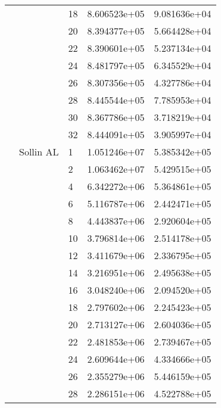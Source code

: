 \begin{tabular}{lllrr}
                      &            & 18 &  8.606523e+05 &  9.081636e+04 \\
                      &            & 20 &  8.394377e+05 &  5.664428e+04 \\
                      &            & 22 &  8.390601e+05 &  5.237134e+04 \\
                      &            & 24 &  8.481797e+05 &  6.345529e+04 \\
                      &            & 26 &  8.307356e+05 &  4.327786e+04 \\
                      &            & 28 &  8.445544e+05 &  7.785953e+04 \\
                      &            & 30 &  8.367786e+05 &  3.718219e+04 \\
                      &            & 32 &  8.444091e+05 &  3.905997e+04 \\
                      & Sollin AL & 1  &  1.051246e+07 &  5.385342e+05 \\
                      &            & 2  &  1.063462e+07 &  5.429515e+05 \\
                      &            & 4  &  6.342272e+06 &  5.364861e+05 \\
                      &            & 6  &  5.116787e+06 &  2.442471e+05 \\
                      &            & 8  &  4.443837e+06 &  2.920604e+05 \\
                      &            & 10 &  3.796814e+06 &  2.514178e+05 \\
                      &            & 12 &  3.411679e+06 &  2.336795e+05 \\
                      &            & 14 &  3.216951e+06 &  2.495638e+05 \\
                      &            & 16 &  3.048240e+06 &  2.094520e+05 \\
                      &            & 18 &  2.797602e+06 &  2.245423e+05 \\
                      &            & 20 &  2.713127e+06 &  2.604036e+05 \\
                      &            & 22 &  2.481853e+06 &  2.739467e+05 \\
                      &            & 24 &  2.609644e+06 &  4.334666e+05 \\
                      &            & 26 &  2.355279e+06 &  5.446159e+05 \\
                      &            & 28 &  2.286151e+06 &  4.522788e+05 \\

\end{tabular}
